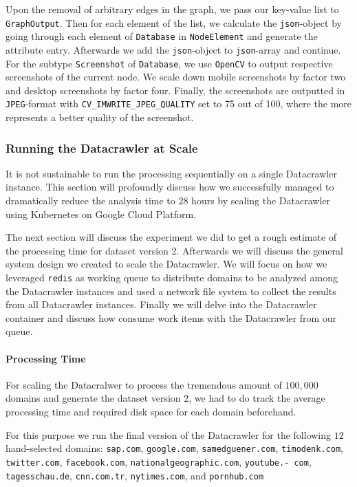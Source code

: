 Upon the removal of arbitrary edges in the graph, we pass our key-value list to \texttt{GraphOutput}. Then for each element of the list, we calculate the \texttt{json}-object by going through each element of \texttt{Database} in \texttt{NodeElement} and generate the attribute entry. Afterwards we add the \texttt{json}-object to \texttt{json}-array and continue. For the subtype \texttt{Screenshot} of \texttt{Database}, we use \texttt{OpenCV} to output respective screenshots of the current node. We scale down mobile screenshots by factor two and desktop screenshots by factor four. Finally, the screenshots are outputted in \texttt{JPEG}-format with \texttt{CV\_IMWRITE\_JPEG\_QUALITY} set to 75 out of 100, where the more represents a better quality of the screenshot. 

\subsubsection{Running the Datacrawler at Scale}
\label{datacrawler_scale}
It is not sustainable to run the processing sequentially on a single Datacrawler instance. This section will profoundly discuss how we successfully managed to dramatically reduce the analysis time to $28$ hours by scaling the Datacrawler using Kubernetes on Google Cloud Platform. 

The next section will discuss the experiment we did to get a rough estimate of the processing time for dataset version 2. Afterwards we will discuss the general system design we created to scale the Datacrawler. We will focus on how we leveraged \texttt{redis} as working queue to distribute domains to be analyzed among the Datacrawler instances and used a network file system to collect the results from all Datacrawler instances. Finally we will delve into the Datacrawler container and discuss how consume work items with the Datacrawler from our queue.

\paragraph*{Processing Time}
\label{datacrawler_processing_time}
For scaling the Datacralwer to process the tremendous amount of $100,000$ domains and generate the dataset version 2, we had to do track the average processing time and required disk space for each domain beforehand.

For this purpose we run the final version of the Datacrawler for the following $12$ hand-selected domains: \texttt{sap.com}, \texttt{google.com}, \texttt{samedguener.com}, \texttt{timodenk.com}, \texttt{twitter.com}, \texttt{facebook.com}, \texttt{nationalgeographic.com}, \texttt{youtube.-
com}, \texttt{tagesschau.de}, \texttt{cnn.com.tr}, \texttt{nytimes.com}, and \texttt{pornhub.com}


